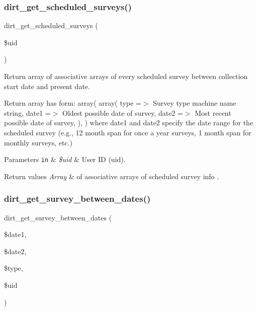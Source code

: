 \subsubsection{\texorpdfstring{dirt\+\_\+get\+\_\+scheduled\+\_\+surveys()}{dirt\_get\_scheduled\_surveys()}}
{\footnotesize\ttfamily dirt\+\_\+get\+\_\+scheduled\+\_\+surveys (\begin{DoxyParamCaption}\item[{}]{\$uid }\end{DoxyParamCaption})}

Return array of associative arrays of every scheduled survey between collection start date and present date.

Return array has form\+: array( array( \textquotesingle{}type\textquotesingle{} =$>$ Survey type machine name string, \textquotesingle{}date1\textquotesingle{} =$>$ Oldest possible date of survey, \textquotesingle{}date2\textquotesingle{} =$>$ Most recent possible date of survey, ), ) where \textquotesingle{}date1\textquotesingle{} and \textquotesingle{}date2\textquotesingle{} specify the date range for the scheduled survey (e.\+g., 12 month span for once a year surveys, 1 month span for monthly surveys, etc.)


\begin{DoxyParams}[1]{Parameters}
\mbox{\tt in}  & {\em \$uid} & User ID (uid).\\
\hline
\end{DoxyParams}

\begin{DoxyRetVals}{Return values}
{\em Array} & of associative arrays of scheduled survey info . \\
\hline
\end{DoxyRetVals}
\mbox{\label{dirt_8data__entry__portal_8inc_af98bdaa6d587757923a538b81bc5a1e8}} 
\subsubsection{\texorpdfstring{dirt\+\_\+get\+\_\+survey\+\_\+between\+\_\+dates()}{dirt\_get\_survey\_between\_dates()}}
{\footnotesize\ttfamily dirt\+\_\+get\+\_\+survey\+\_\+between\+\_\+dates (\begin{DoxyParamCaption}\item[{}]{\$date1,  }\item[{}]{\$date2,  }\item[{}]{\$type,  }\item[{}]{\$uid }\end{DoxyParamCaption})}

